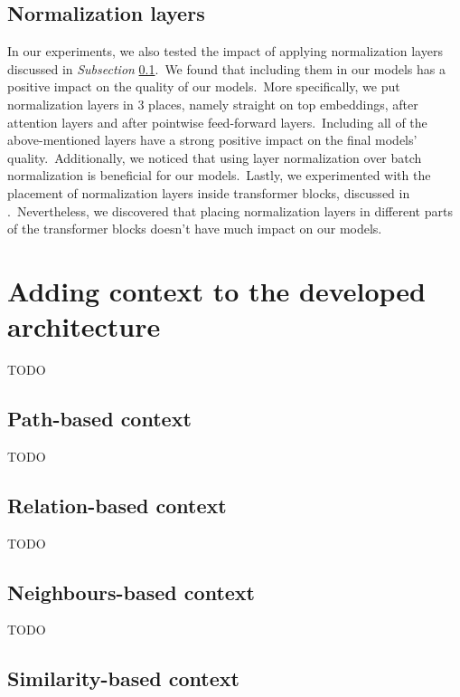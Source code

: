 \documentclass[longabstract, english, mgr]{iithesis}
\theoremstyle{default_theorem_style}\newtheorem{theorem}{Theorem}
\theoremstyle{default_theorem_style}\newtheorem{definition}{Definition}
\begin{document}
\subsection{Normalization layers}\label{subsec:normalization_layers}

In our experiments, we also tested the impact of applying normalization layers discussed in
\textit{Subsection} \ref{subsec:normalization_layers}.\ We found that including them in our models
has a positive impact on the quality of our models.\ More specifically, we put normalization layers in 3 places, namely
straight on top embeddings, after attention layers and after pointwise feed-forward layers.\ Including all of the
above-mentioned layers have a strong positive impact on the final models' quality.\ Additionally, we noticed that
using layer normalization over batch normalization is beneficial for our models.\ Lastly, we experimented with the
placement of normalization layers inside transformer blocks, discussed in
\cite{layer_normalization_in_transformers}.\ Nevertheless, we discovered that placing normalization layers in
different parts of the transformer blocks doesn't have much impact on our models.

\section{Adding context to the developed architecture}

TODO

\subsection{Path-based context}

TODO

\subsection{Relation-based context}

TODO

\subsection{Neighbours-based context}

TODO

\subsection{Similarity-based context}
\end{document}
